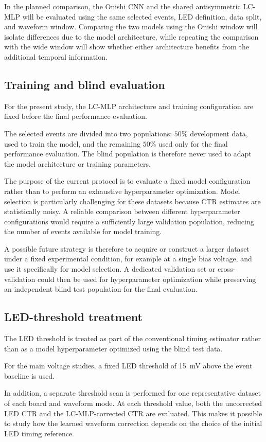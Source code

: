 In the planned comparison, the Onishi CNN and the shared antisymmetric LC-MLP will be evaluated using the same selected events, LED definition, 
data split, and waveform window. Comparing the two models using the Onishi window will isolate differences due to the model architecture, 
while repeating the comparison with the wide window will show whether either architecture benefits from the additional temporal information.


\subsection{Training and blind evaluation}

For the present study, the LC-MLP architecture and training configuration are fixed before the final performance evaluation.

The selected events are divided into two populations: \(50\%\) development data, used to train the model, and the remaining \(50\%\) 
used only for the final performance evaluation. The blind population is therefore never used to adapt the model architecture or training parameters.

The purpose of the current protocol is to evaluate a fixed model configuration rather than to perform an exhaustive hyperparameter optimization. 
Model selection is particularly challenging for these datasets because CTR estimates are statistically noisy. A reliable comparison between 
different hyperparameter configurations would require a sufficiently large validation population, reducing the number of events available for model 
training.

A possible future strategy is therefore to acquire or construct a larger dataset under a fixed experimental condition, 
for example at a single bias voltage, and use it specifically for model selection. A dedicated validation set or cross-validation 
could then be used for hyperparameter optimization while preserving an independent blind test population for the final evaluation.


\subsection{LED-threshold treatment}

The LED threshold is treated as part of the conventional timing estimator rather than as a model hyperparameter optimized using the blind test data.

For the main voltage studies, a fixed LED threshold of \SI{15}{mV} above the event baseline is used.

In addition, a separate threshold scan is performed for one representative dataset of each board and waveform mode. At each threshold value, 
both the uncorrected LED CTR and the LC-MLP-corrected CTR are evaluated. This makes it possible to study how the learned waveform correction 
depends on the choice of the initial LED timing reference.